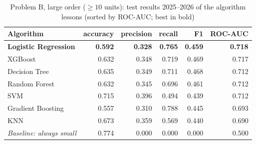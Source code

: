 \begin{table}[htbp]\centering\small
\caption{Problem B, large order ($\geq 10$ units): test results 2025--2026 of the algorithm lessons (sorted by ROC-AUC; best in bold)}\label{tab:algocls}
\begin{tabular}{@{}lrrrrr@{}}
\toprule
\textbf{Algorithm} & \textbf{accuracy} & \textbf{precision} & \textbf{recall} & \textbf{F1} & \textbf{ROC-AUC} \\ \midrule
\textbf{Logistic Regression} & \textbf{0.592} & \textbf{0.328} & \textbf{0.765} & \textbf{0.459} & \textbf{0.718} \\
XGBoost & 0.632 & 0.348 & 0.719 & 0.469 & 0.717 \\
Decision Tree & 0.635 & 0.349 & 0.711 & 0.468 & 0.712 \\
Random Forest & 0.632 & 0.345 & 0.696 & 0.461 & 0.712 \\
SVM & 0.715 & 0.396 & 0.494 & 0.439 & 0.712 \\
Gradient Boosting & 0.557 & 0.310 & 0.788 & 0.445 & 0.693 \\
KNN & 0.673 & 0.359 & 0.569 & 0.440 & 0.690 \\
\midrule
\emph{Baseline: always small} & 0.774 & 0.000 & 0.000 & 0.000 & 0.500 \\
\bottomrule
\end{tabular}
\end{table}
